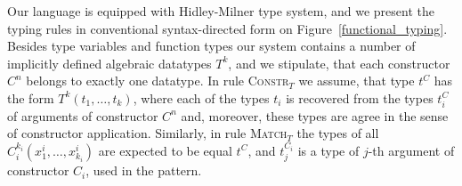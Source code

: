 
Our language is equipped with Hidley-Milner type system, and we present the typing rules in conventional syntax-directed form 
on Figure~\ref{functional_typing}. Besides type variables and function types our system contains a number of implicitly defined 
algebraic datatypes $T^k$, and we stipulate, that each constructor $C^n$ belongs to exactly one
datatype. In rule \textsc{Constr$_T$} we assume, that type $t^C$ has the form $T^k(t_1,\dots,t_k)$, where each of the types
$t_i$ is recovered from the types $t_i^C$ of arguments of constructor $C^n$ and, moreover, these types are agree in the sense of
constructor application. Similarly, in rule \textsc{Match$_T$} the types of all $C_i^{k_i}(x^i_1,\dots,x^i_{k_i})$ are expected
to be equal $t^C$, and $t^{C_i}_j$ is a type of $j$-th argument of constructor $C_i$, used in the pattern.

\setarrow{:}
\newcommand{\typed}[3]{\withenv{#1}{\trans{#2}{}{#3}}}

